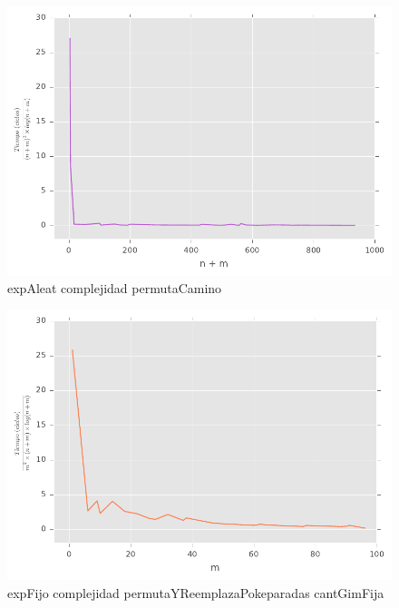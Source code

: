 \begin{figure}[H]
  \begin{center}
    \includegraphics{../experimentacion/ej3/expAleat_complejidad_permutaCamino.pdf}
    \caption{expAleat complejidad permutaCamino}
    \label{fig:expAleat_complejidad_permutaCamino}
  \end{center}
\end{figure}

\begin{figure}[H]
  \begin{center}
    \includegraphics{../experimentacion/ej3/expFijo_complejidad_permutaYReemplazaPokeparadas_cantGimFija.pdf}
    \caption{expFijo complejidad permutaYReemplazaPokeparadas cantGimFija}
    \label{fig:expFijo_complejidad_permutaYReemplazaPokeparadas_cantGimFija}
  \end{center}
\end{figure}

